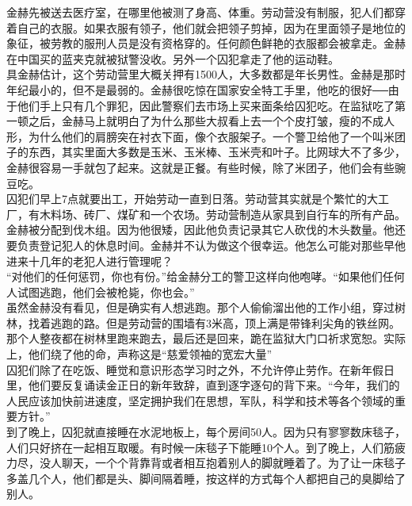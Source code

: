金赫先被送去医疗室，在哪里他被测了身高、体重。劳动营没有制服，犯人们都穿着自己的衣服。如果衣服有领子，他们就会把领子剪掉，因为在里面领子是地位的象征，被劳教的服刑人员是没有资格穿的。任何颜色鲜艳的衣服都会被拿走。金赫在中国买的蓝夹克就被狱警没收。另外一个囚犯拿走了他的运动鞋。\\

具金赫估计，这个劳动营里大概关押有1500人，大多数都是年长男性。金赫是那时年纪最小的，但不是最弱的。金赫很吃惊在国家安全特工手里，他吃的很好──由于他们手上只有几个罪犯，因此警察们去市场上买来面条给囚犯吃。在监狱吃了第一顿之后，金赫马上就明白了为什么那些大叔看上去一个个皮打皱，瘦的不成人形，为什么他们的肩膀突在衬衣下面，像个衣服架子。一个警卫给他了一个叫米团子的东西，其实里面大多数是玉米、玉米棒、玉米壳和叶子。比网球大不了多少，金赫很容易一手就包了起来。这就是正餐。有些时候，除了米团子，他们会有些豌豆吃。\\

囚犯们早上7点就要出工，开始劳动一直到日落。劳动营其实就是个繁忙的大工厂，有木料场、砖厂、煤矿和一个农场。劳动营制造从家具到自行车的所有产品。金赫被分配到伐木组。因为他很矮，因此他负责记录其它人砍伐的木头数量。他还要负责登记犯人的休息时间。金赫并不认为做这个很幸运。他怎么可能对那些早他进来十几年的老犯人进行管理呢？\\

“对他们的任何惩罚，你也有份。”给金赫分工的警卫这样向他咆哮。“如果他们任何人试图逃跑，他们会被枪毙，你也会。”\\

虽然金赫没有看见，但是确实有人想逃跑。那个人偷偷溜出他的工作小组，穿过树林，找着逃跑的路。但是劳动营的围墙有3米高，顶上满是带锋利尖角的铁丝网。那个人整夜都在树林里跑来跑去，最后还是回来，跪在监狱大门口祈求宽恕。实际上，他们绕了他的命，声称这是“慈爱领袖的宽宏大量”\\

囚犯们除了在吃饭、睡觉和意识形态学习时之外，不允许停止劳作。在新年假日里，他们要反复诵读金正日的新年致辞，直到逐字逐句的背下来。“今年，我们的人民应该加快前进速度，坚定拥护我们在思想，军队，科学和技术等各个领域的重要方针。”\\

到了晚上，囚犯就直接睡在水泥地板上，每个房间50人。因为只有寥寥数床毯子，人们只好挤在一起相互取暖。有时候一床毯子下能睡10个人。到了晚上，人们筋疲力尽，没人聊天，一个个背靠背或者相互抱着别人的脚就睡着了。为了让一床毯子多盖几个人，他们都是头、脚间隔着睡，按这样的方式每个人都把自己的臭脚给了别人。\\

